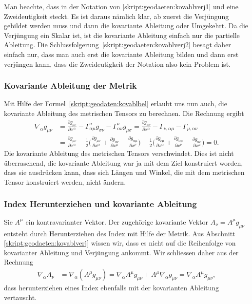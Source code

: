 Man beachte, dass in der Notation von
\eqref{skript:geodaeten:kovablverj1}
und
eine Zweideutigkeit steckt.
Es ist daraus nämlich klar, ab zuerst die Verjüngung gebildet werden muss
und dann die kovariante Ableitung oder Umgekehrt.
Da die Verjüngung ein Skalar ist, ist die kovariante Ableitung einfach
nur die partielle Ableitung.
Die Schlussfolgerung~\eqref{skript:geodaeten:kovablverj2} besagt daher
einfach nur, dass man auch erst die kovariante Ableitung bilden und
dann erst verjüngen kann, dass die Zweideutigkeit der Notation also
kein Problem ist.

\subsubsection{Kovariante Ableitung der Metrik}
Mit Hilfe der Formel~\eqref{skript:geodaten:kovablbel} erlaubt uns nun
auch, die kovariante Ableitung des metrischen Tensors zu berechnen.
Die Rechnung ergibt
\begin{align*}
\nabla_\alpha g_{\mu\nu}
&=
\frac{\partial g_{\mu\nu}}{\partial x^\alpha}
-\Gamma^\sigma_{\alpha\mu}g_{\sigma\nu}
-\Gamma^\sigma_{\alpha\nu}g_{\mu\sigma}
=
\frac{\partial g_{\mu\nu}}{\partial x^\alpha}
-\Gamma_{\nu,\alpha\mu}
-\Gamma_{\mu,\alpha\nu}
\\
&=
\frac{\partial g_{\mu\nu}}{\partial x^\alpha}
-
\frac12\biggl(
\frac{\partial g_{\mu\nu}}{\partial x^\alpha}
+
\frac{\partial g_{\alpha\nu}}{\partial x^\mu}
-
\frac{\partial g_{\alpha\mu}}{\partial x^\nu}
\biggr)
-
\frac12\biggl(
\frac{\partial g_{\nu\mu}}{\partial x^\alpha}
+
\frac{\partial g_{\alpha\mu}}{\partial x^\nu}
-
\frac{\partial g_{\alpha\nu}}{\partial x^\mu}
\biggr)
=0.
\end{align*}
Die kovariante Ableitung des metrischen Tensors verschwindet.
Dies ist nicht überraschend, die kovariante Ableitung war ja mit dem Ziel
konstruiert worden, dass sie ausdrücken kann, dass sich Längen und
Winkel, die mit dem metrischen Tensor konstruiert werden, nicht ändern.

\subsubsection{Index Herunterziehen und kovariante Ableitung}
Sie $A^\mu$ ein kontravarianter Vektor.
Der zugehörige kovariante Vektor $A_\nu=A^\mu g_{\mu\nu}$ entsteht
durch Herunterziehen des Index mit Hilfe der Metrik.
Aus Abschnitt \ref{skript:geodaeten:kovablverj} wissen wir, dass es nicht
auf die Reihenfolge von kovarianter Ableitung und Verjüngung ankommt.
Wir schliessen daher aus der Rechnung
\begin{align*}
\nabla_\alpha A_\nu
&=
\nabla_\alpha(A^\mu g_{\mu\nu})
=
\nabla_\alpha A^\mu g_{\mu\nu} + A^\mu\nabla_\alpha g_{\mu\nu}
=
\nabla_\alpha A^\mu g_{\mu\nu},
\end{align*}
dass herunterziehen eines Index ebenfalls mit der kovarianten Ableitung
vertauscht.


